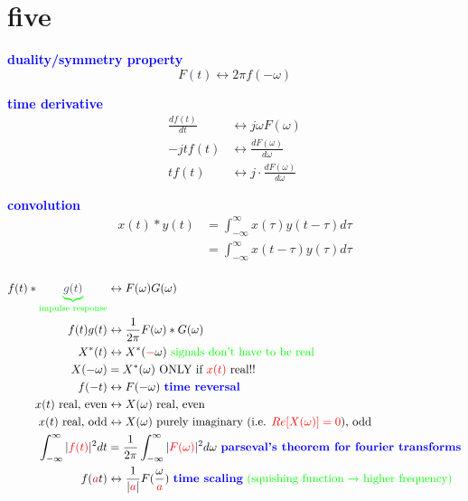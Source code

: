 \documentclass[a5paper, fleqn]{article}
\newcommand{\vocab}[1]{\textbf{\textcolor{blue}{#1}}}
\newcommand{\emf}[1]{\textcolor{red}{#1}}
\newcommand{\note}[1]{\textcolor{green}{#1}}
\newcommand{\eq}[1]{\textcolor{red}{$#1$}}
\newcommand{\under}[2]{\textcolor{green}{\underbrace{\textcolor{secondary}{#1}}_\text{#2}}}
\begin{document}
\section*{\textcolor{primary}{five}}

\vocab{duality/symmetry property}
\[F(t) \leftrightarrow 2\pi f(-\omega)\]

\vocab{time derivative}
\begin{align*}
  \frac{df(t)}{dt} & \leftrightarrow j\omega F(\omega)                  \\
  -jt f(t)         & \leftrightarrow \frac{dF(\omega)}{d\omega}         \\
  t f(t)           & \leftrightarrow j \cdot \frac{dF(\omega)}{d\omega}
\end{align*}

\vocab{convolution}
\begin{align*}
  x(t) * y(t)
   & = \int_{-\infty}^\infty x(\tau) y(t - \tau) d\tau \\
   & = \int_{-\infty}^\infty x(t - \tau) y(\tau) d\tau \\
\end{align*}

\begin{align*}
  f(t) * \under{g(t)}{impulse response}   & \leftrightarrow F(\omega) G(\omega)                                                                                                            \\
  f(t) g(t)                               & \leftrightarrow \frac{1}{2\pi} F(\omega) * G(\omega)                                                                                           \\
  X^*(t)                                  & \leftrightarrow X^*(\emf{-}\omega) ~ \note{\text{signals don't have to be real}}                                                               \\
  X(-\omega)                              & = X^*(\omega) ~ \text{ONLY if \eq{x(t)} real!!}                                                                                                \\
  f(-t)                                   & \leftrightarrow F(-\omega) ~ \vocab{time reversal}                                                                                             \\
  x(t)\text{ real, even}                  & \leftrightarrow X(\omega)\text{ real, even}                                                                                                    \\
  x(t)\text{ real, odd}                   & \leftrightarrow X(\omega)\text{ purely imaginary (i.e. \eq{Re[X(\omega)] = 0}), odd}                                                           \\
  \int_{-\infty}^\infty |\emf{f(t)}|^2 dt & = \frac{1}{2\pi} \int_{-\infty}^\infty |\emf{F(\omega)}|^2 d\omega ~ \vocab{parseval's theorem for fourier transforms}                         \\
  f(\emf{a}t)                             & \leftrightarrow \frac{1}{|\emf{a}|} F(\frac{\omega}{\emf{a}}) ~ \text{\vocab{time scaling} \note{(squishing function $\to$ higher frequency)}}
\end{align*}
\end{document}
